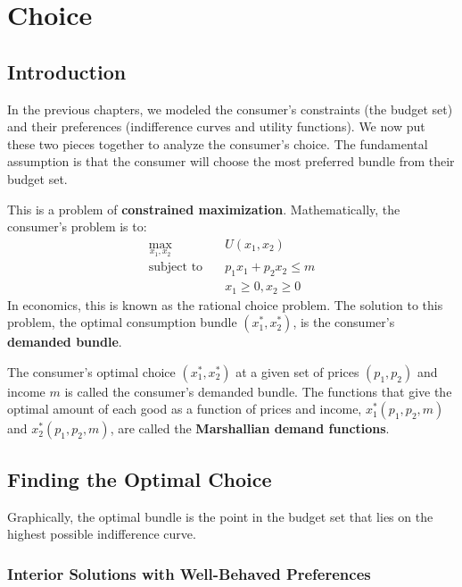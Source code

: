
\chapter{Choice}
\label{chap:choice}

\section{Introduction}

In the previous chapters, we modeled the consumer's constraints (the budget set) and their preferences (indifference curves and utility functions). We now put these two pieces together to analyze the consumer's choice. The fundamental assumption is that the consumer will choose the most preferred bundle from their budget set.

This is a problem of \textbf{constrained maximization}. Mathematically, the consumer's problem is to:
\begin{align*}
    \max_{x_1, x_2} \quad & U(x_1, x_2) \\
    \text{subject to} \quad & p_1x_1 + p_2x_2 \leq m \\
    & x_1 \geq 0, x_2 \geq 0
\end{align*}
In economics, this is known as the rational choice problem. The solution to this problem, the optimal consumption bundle $(x_1^*, x_2^*)$, is the consumer's \textbf{demanded bundle}.

\begin{definition}
The consumer's optimal choice $(x_1^*, x_2^*)$ at a given set of prices $(p_1, p_2)$ and income $m$ is called the consumer's demanded bundle. The functions that give the optimal amount of each good as a function of prices and income, $x_1^*(p_1, p_2, m)$ and $x_2^*(p_1, p_2, m)$, are called the \textbf{Marshallian demand functions}.
\end{definition}

\section{Finding the Optimal Choice}

Graphically, the optimal bundle is the point in the budget set that lies on the highest possible indifference curve.

\subsection{Interior Solutions with Well-Behaved Preferences}

